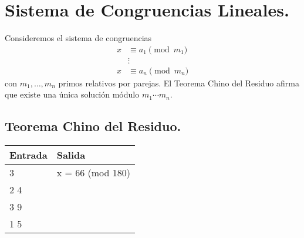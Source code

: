 \documentclass[12pt, letterpaper, twoside]{article}
\begin{document}
\newpage

\section{Sistema de Congruencias Lineales.}

Consideremos el sistema de congruencias
\begin{align*}
x &\equiv a_1 \pmod{m_1}\\
&\vdots\\
x &\equiv a_n \pmod{m_n}
\end{align*}
con $m_1, \ldots, m_n$ primos relativos por parejas. El Teorema Chino del Residuo afirma que existe una única solución módulo $m_1\cdots m_n$.

\subsection{Teorema Chino del Residuo.}

 \medskip

\begin{tabular}{|p{7cm}|p{7cm}|}
\hline
\textbf{Entrada} & \textbf{Salida}\\ \hline
3   & x = 66 (mod 180)\\
2 4 & \\ 
3 9 & \\ 
1 5 & \\ \hline
\end{tabular}

\newpage
\end{document}
